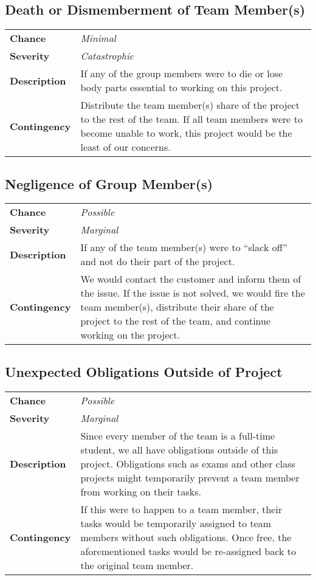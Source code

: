 \documentclass[12pt]{article}
\begin{document}
\subsection*{Death or Dismemberment of Team Member(s)}
\begin{tabular}{ l p{10cm} }
	\textbf{Chance} & \textit{Minimal} \\
	\textbf{Severity} & \textit{Catastrophic} \\
	\textbf{Description} & If any of the group members were to die or lose body
		parts essential to working on this project. \\
	\textbf{Contingency} & Distribute the team member(s) share of the project
		to the rest of the team. If all team members were to become unable to
		work, this project would be the least of our concerns. \\
\end{tabular}

\subsection*{Negligence of Group Member(s)}
\begin{tabular}{ l p{10cm} }
	\textbf{Chance} & \textit{Possible} \\
	\textbf{Severity} & \textit{Marginal} \\
	\textbf{Description} & If any of the team member(s) were to ``slack off''
		and not do their part of the project. \\
	\textbf{Contingency} & We would contact the customer and inform them of the
		issue. If the issue is not solved, we would fire the team member(s),
		distribute their share of the project to the rest of the team, and
		continue working on the project. \\
\end{tabular}

\subsection*{Unexpected Obligations Outside of Project}
\begin{tabular}{ l p{10cm} }
	\textbf{Chance} & \textit{Possible} \\
	\textbf{Severity} & \textit{Marginal} \\
	\textbf{Description} & Since every member of the team is a full-time
		student, we all have obligations outside of this project. Obligations
		such as exams and other class projects might temporarily prevent a team
		member from working on their tasks. \\
	\textbf{Contingency} & If this were to happen to a team member, their tasks
		would be temporarily assigned to team members without such obligations.
		Once free, the aforementioned tasks would be re-assigned back to the
		original team member. \\
\end{tabular}
\end{document}
